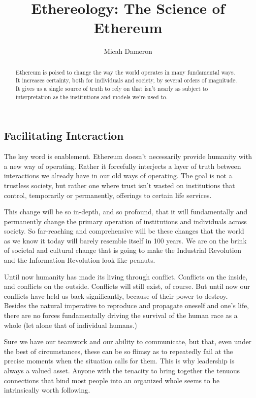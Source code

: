 \documentclass[a4paper,oneside]{article}
\title{Ethereology: The Science of Ethereum}
\author{Micah Dameron}
\begin{document}
\maketitle

\begin{abstract}
Ethereum is poised to change the way the world operates in many fundamental ways. It increases certainty, both for individuals and society, by several orders of magnitude. It gives us a single source of truth to rely on that isn't nearly as subject to interpretation as the institutions and models we're used to. 
\end{abstract}

\begin{multicols}{2}

\section{Facilitating Interaction}
The key word is enablement. Ethereum  doesn't necessarily provide humanity with a new way of operating. Rather it forcefully interjects a layer of truth between interactions we already have in our old ways of operating. The goal is not a trustless society, but rather one where trust isn't wasted on institutions that control, temporarily or permanently, offerings to certain life services.

This change will be so in-depth, and so profound, that it will fundamentally and permanently change the primary operation of institutions and individuals across society. So far-reaching and comprehensive will be these changes that the world as we know it today will barely resemble itself in 100 years. We are on the brink of societal and cultural change that is going to make the Industrial Revolution and the Information Revolution look like peanuts. 

Until now humanity has made its living through conflict. Conflicts on the inside, and conflicts on the outside. Conflicts will still exist, of course. But until now our conflicts have held us back significantly, because of their power to destroy. Besides the natural imperative to reproduce and propagate oneself and one's life, there are no forces fundamentally driving the survival of the human race as a whole (let alone that of individual humans.) 

Sure we have our teamwork and our ability to communicate, but that, even under the best of circumstances, these can be so flimsy as to repeatedly fail at the precise moments when the situation calls for them. This is why leadership is always a valued asset. Anyone with the tenacity to bring together the tenuous connections that bind most people into an organized whole seems to be intrinsically worth following. 


\end{multicols}
\end{document}
